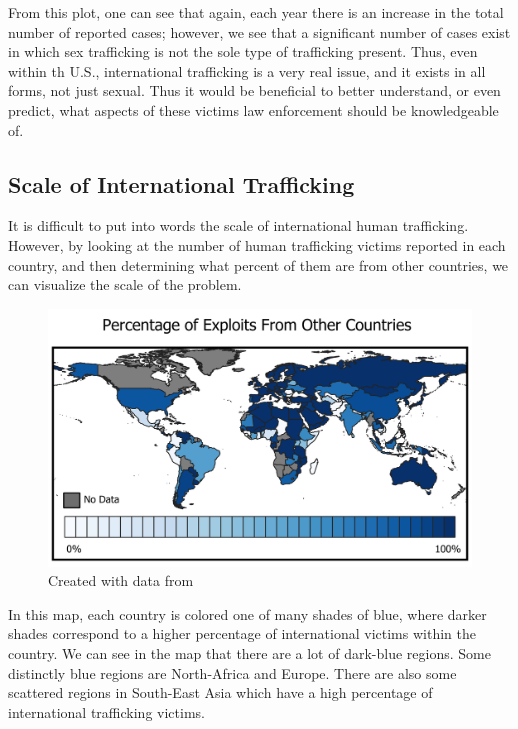 \documentclass{article} %
\begin{document}
\FloatBarrier

From this plot, one can see that again, each year there is an increase in the total number of reported cases; however, we see that a significant number of cases exist in which sex trafficking is not the sole type of trafficking present. Thus, even within th U.S., international trafficking is a very real issue, and it exists in all forms, not just sexual. Thus it would be beneficial to better understand, or even predict, what aspects of these victims law enforcement should be knowledgeable of. 

\subsection*{Scale of International Trafficking}

It is difficult to put into words the scale of international human trafficking. However, by looking at the number of human trafficking victims reported in each country, and then determining what percent of them are from other countries, we can visualize the scale of the problem.

\FloatBarrier

\begin{center}
	\begin{figure}[H]
		\includegraphics[width = 5.6in]{ProposalMap1}
		\scriptsize{\caption{Created with data from \cite{CTDC}}}
	\end{figure}
\end{center}
\FloatBarrier

In this map, each country is colored one of many shades of blue, where darker shades correspond to a higher percentage of international victims within the country. We can see in the map that there are a lot of dark-blue regions. Some distinctly blue regions are North-Africa and Europe. There are also some scattered regions in South-East Asia which have a high percentage of international trafficking victims. 
\end{document}
